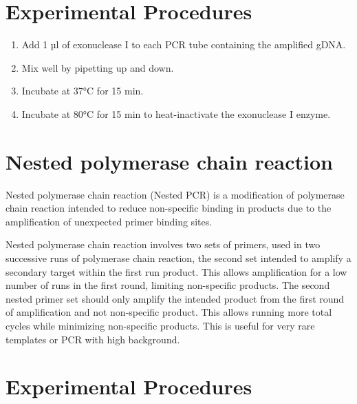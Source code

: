 \documentclass[]{book}
\providecommand{\tightlist}{%
  \setlength{\itemsep}{0pt}\setlength{\parskip}{0pt}}
\theoremstyle{definition}
\theoremstyle{definition}
\theoremstyle{definition}
\theoremstyle{remark}
\begin{document}
\section{Experimental Procedures}\label{experimental-procedures-9}

\begin{enumerate}
\def\labelenumi{\arabic{enumi}.}
\tightlist
\item
  Add 1 µl of exonuclease I to each PCR tube containing the amplified
  gDNA.
\item
  Mix well by pipetting up and down.
\item
  Incubate at 37°C for 15 min.
\item
  Incubate at 80°C for 15 min to heat-inactivate the exonuclease I
  enzyme.
\end{enumerate}

\section{Nested polymerase chain
reaction}\label{nested-polymerase-chain-reaction}

Nested polymerase chain reaction (Nested PCR) is a modification of
polymerase chain reaction intended to reduce non-specific binding in
products due to the amplification of unexpected primer binding sites.

Nested polymerase chain reaction involves two sets of primers, used in
two successive runs of polymerase chain reaction, the second set
intended to amplify a secondary target within the first run product.
This allows amplification for a low number of runs in the first round,
limiting non-specific products. The second nested primer set should only
amplify the intended product from the first round of amplification and
not non-specific product. This allows running more total cycles while
minimizing non-specific products. This is useful for very rare templates
or PCR with high background.

\section{Experimental Procedures}\label{experimental-procedures-10}
\end{document}
